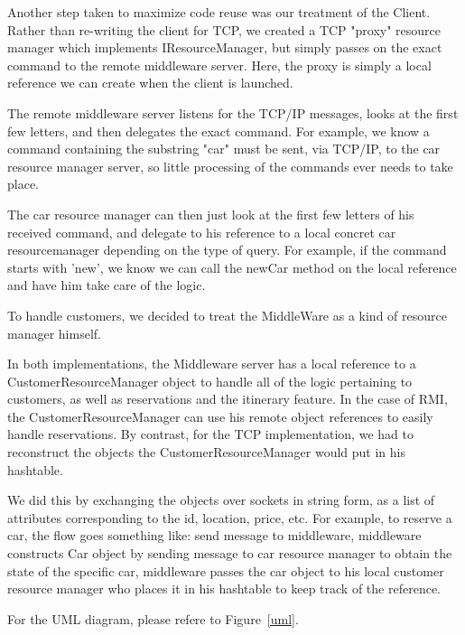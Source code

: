 \documentclass[a4paper]{article}
\begin{document}
Another step taken to maximize code reuse was our treatment of the Client. Rather than re-writing the client for TCP, we created a TCP "proxy" resource
manager which implements IResourceManager, but simply passes on the exact command to the remote middleware server. Here, the proxy is simply a local
reference we can create when the client is launched.


The remote middleware server listens for the TCP/IP messages, looks at the first few letters, and then delegates the exact command. For example, we know a command containing the substring "car" must be sent, via TCP/IP, to the car resource manager server, so little processing of the commands ever needs to take place. 

The car resource manager can then just look at the first few letters of his received command,
and delegate to his reference to a local concret car resourcemanager depending on the type of query. For example, if the command starts with 'new', we know
we can call the newCar method on the local reference and have him take care of the logic. 



To handle customers, we decided to treat the MiddleWare as a kind of resource manager himself. 

In both implementations, the Middleware server has a local reference to a CustomerResourceManager object to handle all of the logic pertaining to customers, as well as reservations and the itinerary feature. In the case of RMI, the CustomerResourceManager can use his remote object references to easily handle reservations. By contrast, for the TCP implementation, we had to reconstruct the objects the CustomerResourceManager would put in his hashtable. 

We did this by exchanging the objects over sockets in string form, as a list of attributes corresponding to the id, location, price, etc. For example, to reserve a car, the flow goes something like: send message to middleware, middleware constructs Car object by sending message to car resource manager to obtain the state of the specific car, middleware passes the car object to his local customer resource manager who places it in his hashtable to keep track of the reference. 


For the UML diagram, please refere to Figure~\ref{uml}.
\end{document}
